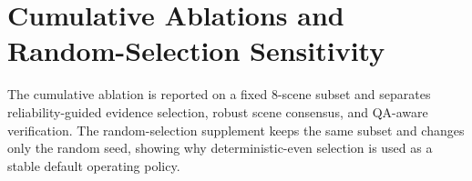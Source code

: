 \documentclass[runningheads]{LaTeX2e_Proceedings_Templates/llncs}
\begin{document}
\begin{table}[t]
\centering
\scriptsize
\setlength{\tabcolsep}{3pt}
\caption{Selected reliability rules that separate QA-filtered scene decisions from retained scenes.}
\label{tab:supp_reliability_rules}
\end{table}

\begin{table}[t]
\centering
\scriptsize
\setlength{\tabcolsep}{3pt}
\caption{Paired-control scenes illustrating how the reliability criterion captures scene-level behavior beyond pairwise match availability.}
\label{tab:supp_paired_controls}
\end{table}


\section{Cumulative Ablations and Random-Selection Sensitivity}

The cumulative ablation is reported on a fixed 8-scene subset and separates reliability-guided
evidence selection, robust scene consensus, and QA-aware verification. The random-selection
supplement keeps the same subset and changes only the random seed, showing why deterministic-even
selection is used as a stable default operating policy.
\end{document}
